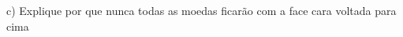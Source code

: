\documentclass[preview]{standalone}
\begin{document}
\begin{center}
c) Explique por que nunca todas as moedas ficarão com a face cara voltada para cima
\end{center}
\end{document}
